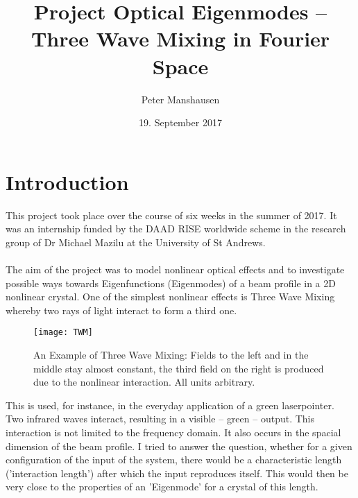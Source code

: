 \documentclass{article}
\begin{document}
\title{Project Optical Eigenmodes -- Three Wave Mixing in Fourier Space}
\author{ Peter Manshausen}
\date{19. September 2017}
\maketitle
\section{Introduction}
This project took place over the course of six weeks in the summer of 2017. It was an internship funded by the DAAD RISE worldwide scheme in the research group of Dr Michael Mazilu at the University of St Andrews. 
\\
\\
The aim of the project was to model nonlinear optical effects and to investigate possible ways towards Eigenfunctions (Eigenmodes) of a beam profile in a 2D nonlinear crystal. One of the simplest nonlinear effects is Three Wave Mixing whereby two rays of light interact to form a third one. 
\begin{figure}[h]
\texttt{[image: TWM]}
\caption{An Example of Three Wave Mixing: Fields to the left and in the middle stay almost constant, the third field on the right is produced due to the nonlinear interaction. All units arbitrary.}
\end{figure}
This is used, for instance, in the everyday application of a green laserpointer. Two infrared waves interact, resulting in a visible -- green -- output. This interaction is not limited to the frequency domain. It also occurs in the spacial dimension of the beam profile. I tried to answer the question, whether for a given configuration of the input of the system, there would be a characteristic length ('interaction length') after which the input reproduces itself. This would then be very close to the properties of an 'Eigenmode' for a crystal of this length. 
\end{document}
